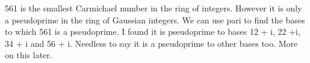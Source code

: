 \documentclass[12pt]{article}
\begin{document}
561  is  the  smallest  Carmichael  number  in  the  ring of
integers. However  it is  only  a  pseudoprime  in the ring
of  Gaussian  integers.  We  can  use  pari to  find
the  bases  to  which  561  is  a  pseudoprime.  I  
found it  is   pseudoprime to bases  12  +  i,  22  +i,
34  +  i  and  56  +  i.  Needless  to  say  it is  a
pseudoprime to  other  bases  too. More  on  this later.
\end{document}
